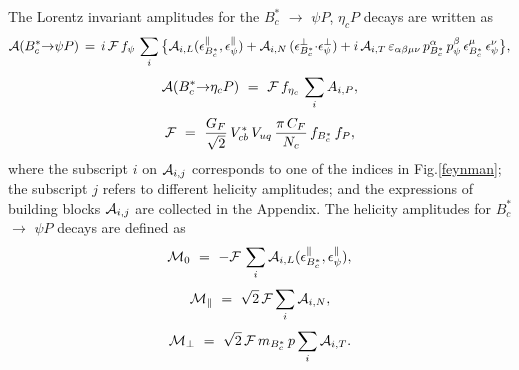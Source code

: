 \documentclass[preprint,superscriptaddress,nofootinbib]{revtex4}
\begin{document}
  The Lorentz invariant amplitudes for the $B_{c}^{{\ast}}$ ${\to}$ ${\psi}P$,
  ${\eta}_{c}P$ decays are written as
   \begin{equation}
  {\cal A}(B_{c}^{\ast}{\to}{\psi}P)\, =\,
  i\,{\cal F}\,f_{{\psi}}\, \sum\limits_{i}\big\{
  {\cal A}_{i,L}({\epsilon}_{B_{c}^{\ast}}^{{\parallel}},{\epsilon}_{{\psi}}^{{\parallel}})
 +{\cal A}_{i,N}\,({\epsilon}_{B_{c}^{\ast}}^{{\perp}}{\cdot}{\epsilon}_{{\psi}}^{{\perp}})
 +i\,{\cal A}_{i,T}\,{\varepsilon}_{{\alpha}{\beta}{\mu}{\nu}}\,
  p_{B_{c}^{\ast}}^{\alpha}\,p_{{\psi}}^{\beta}\,
  {\epsilon}_{B_{c}^{\ast}}^{{\mu}}\, {\epsilon}_{{\psi}}^{{\nu}} \big\}
   \label{amp-bc-psip},
   \end{equation}
   \begin{equation}
  {\cal A}(B_{c}^{{\ast}}{\to}{\eta}_{c}P)\ =\
  {\cal F}\,f_{{\eta}_{c}}\, \sum\limits_{i}A_{i,P}
   \label{amp-bc-etacp},
   \end{equation}
   \begin{equation}
  {\cal F}\ =\
   \frac{G_{F}}{\sqrt{2}}\, V_{cb}^{\ast}\,V_{uq}\,
   \frac{{\pi}\,C_{F}}{N_{c}}\, f_{B_{c}^{\ast}}\,f_{P}
   \label{amp-bc-ccp},
   \end{equation}
  where the subscript $i$ on ${\cal A}_{i,j}$ corresponds to
  one of the indices in Fig.\ref{feynman}; the subscript $j$ refers
  to different helicity amplitudes; and the expressions of
  building blocks ${\cal A}_{i,j}$ are collected in the Appendix.
  The helicity amplitudes for $B_{c}^{\ast}$ ${\to}$ ${\psi}P$
  decays are defined as
   \begin{equation}
  {\cal M}_{0}\ =\ -{\cal F}\,\sum\limits_{i}
  {\cal A}_{i,L}({\epsilon}_{B_{c}^{\ast}}^{{\parallel}},{\epsilon}_{\psi}^{{\parallel}})
   \label{eq:amp02},
   \end{equation}
   \begin{equation}
  {\cal M}_{\parallel}\ =\ \sqrt{2}\,{\cal F} \sum\limits_{i}
  {\cal A}_{i,N}
   \label{eq:amp03},
   \end{equation}
   \begin{equation}
  {\cal M}_{\perp}\ =\ \sqrt{2}\,{\cal F}\,m_{B_{c}^{\ast}}\,p \sum\limits_{i}
  {\cal A}_{i,T}
   \label{eq:amp04}.
   \end{equation}
\end{document}
